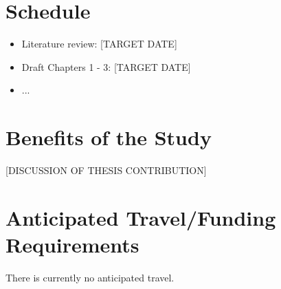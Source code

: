 \documentclass{article}
\begin{document}
\section{Schedule}

\begin{itemize}
\item Literature review: [TARGET DATE]
\item Draft Chapters 1 - 3: [TARGET DATE]
\item ...
\end{itemize}

%
\section {Benefits of the Study}

[DISCUSSION OF THESIS CONTRIBUTION]

%
\section{Anticipated Travel/Funding Requirements}
There is currently no anticipated travel.
\end{document}
